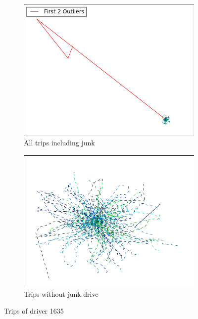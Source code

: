 \documentclass{vldb}
\begin{document}
\begin{figure}
\begin{subfigure}{\linewidth}
	\centering
	\includegraphics[width=0.8\linewidth]{"pics/outliers_junk/D_1635_unclean"}
	\caption{All trips including junk}
	\label{subfig:d-1635-junk}
\end{subfigure}
\begin{subfigure}{\linewidth}
  \centering
	\includegraphics[width=0.8\linewidth]{"pics/outliers_junk/D_1635_clean"}
	\caption{Trips without junk drive}
	\label{subfig:d-1635}
\end{subfigure}
\caption{Trips of driver 1635}
\label{fig:d-1635}
\end{figure}
\end{document}
